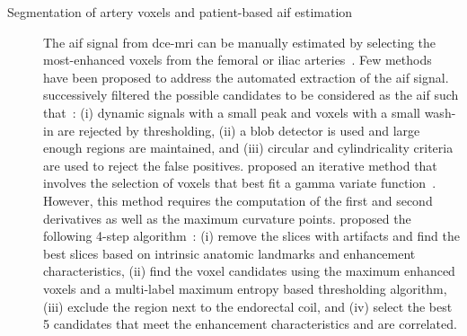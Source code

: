 \begin{description}
  \item[Segmentation of artery voxels and patient-based \ac{aif} estimation] The \ac{aif} signal from \ac{dce}-\ac{mri} can be manually estimated by selecting the most-enhanced voxels from the femoral or iliac arteries~\citep{meng2010comparison}.
    Few methods have been proposed to address the automated extraction
    of the \ac{aif} signal.
    \citeauthor{chen2008automatic} successively filtered the possible
    candidates to be considered as the \ac{aif} such that~\citep{chen2008automatic}:
    (i) dynamic signals with a small peak and voxels with a small wash-in are rejected by thresholding,
    (ii) a blob detector is used and large enough regions are maintained, and
    (iii) circular and cylindricality criteria are used to reject the false positives.
    \citeauthor{zhu2011automated} proposed an iterative method that
    involves the selection of voxels that best fit a gamma variate function~\citep{zhu2011automated}.
    However, this method requires the computation of the first and
    second derivatives as well as the maximum curvature points.
    \citeauthor{shanbhag2012generalized} proposed the following 4-step algorithm~\citep{shanbhag2012generalized,fennessy2015quantitative}:
    (i) remove the slices with artifacts and find the best slices based on intrinsic anatomic landmarks and enhancement characteristics,
    (ii) find the voxel candidates using the maximum enhanced voxels and a multi-label maximum entropy based thresholding algorithm,
    (iii) exclude the region next to the endorectal coil, and
    (iv) select the best 5 candidates that meet the enhancement characteristics and are correlated.


\end{description}
